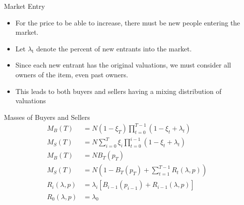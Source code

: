 \documentclass[bigger]{beamer}
\begin{document}
\begin{frame}[label=sec-1-17]{Market Entry}
\begin{itemize}
\item For the price to be able to increase, there must be new people
entering the market.
\item Let $\lambda$$_{\text{t}}$ denote the percent of new entrants into the market.
\item Since each new entrant has the original valuations, we must consider
all owners of the item, even past owners.
\item This leads to both buyers and sellers having a mixing distribution
of valuations
\end{itemize}
\end{frame}

\begin{frame}[label=sec-1-18]{Masses of Buyers and Sellers}
\begin{align*}
M_B(T) &= N (1-\xi_T ) \prod_{t=0}^{T-1} ( 1 - \xi_t + \lambda_t ) \\
M_S(T) &= N \sum_{i = 0}^T \xi_i \prod_{t=0}^{i-1} ( 1- \xi_t + \lambda_t )\\
M_B(T) &= N B_T ( p_T )\\
M_S(T) &= N \left ( 1 - B_T(p_T) + \sum_{t=1}^{T-1}  R_{t}(\lambda,p) \right )\\
R_i(\lambda,p) &= \lambda_i \left [ B_{i-1}(p_{i-1} ) + R_{i-1}(\lambda, p) \right ]\\
R_0 (\lambda,p) &= \lambda_0 \\
\end{align*}
\end{frame}
\end{document}
